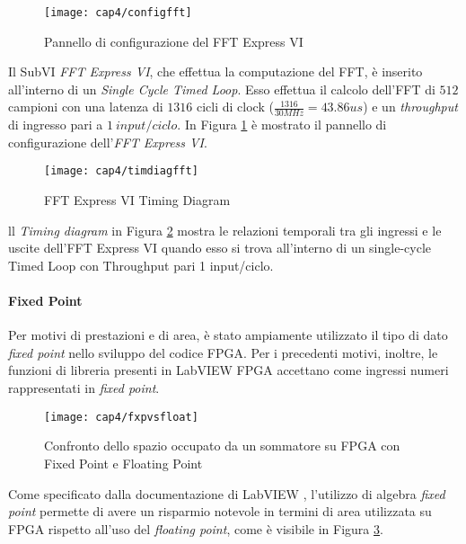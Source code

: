 \begin{figure}  
  \begin{center}
    \texttt{[image: cap4/configfft]}
    \caption{Pannello di configurazione del FFT Express VI}
    \label{configfft}
  \end{center}
\end{figure}

Il SubVI \textit{FFT Express VI}, che effettua la computazione del FFT, è inserito all'interno di un \textit{Single Cycle Timed Loop}. Esso effettua il calcolo dell'FFT di $512$ campioni con una latenza di $1316$ cicli di clock ($\frac{1316}{30MHz}=43.86us$) e un \textit{throughput} di ingresso pari a $1\ input/ciclo$. In Figura \ref{configfft} è mostrato il pannello di configurazione dell'\textit{FFT Express VI}.

\begin{figure}  
  \begin{center}
    \texttt{[image: cap4/timdiagfft]}
    \caption{FFT Express VI Timing Diagram}
    \label{timdiagfft}
  \end{center}
\end{figure}

ll \textit{Timing diagram} in Figura \ref{timdiagfft} mostra le relazioni temporali tra gli ingressi e le uscite dell'FFT Express VI quando esso si trova all'interno di un single-cycle Timed Loop con Throughput pari 1 input/ciclo.

			
\paragraph{Fixed Point}
Per motivi di prestazioni e di area, è stato ampiamente utilizzato il tipo di dato \textit{fixed point} nello sviluppo del codice FPGA. Per i precedenti motivi, inoltre, le funzioni di libreria presenti in LabVIEW FPGA accettano come ingressi numeri rappresentati in \textit{fixed point}.
\begin{figure}  
  \begin{center}
    \texttt{[image: cap4/fxpvsfloat]}
    \caption{Confronto dello spazio occupato da un sommatore su FPGA con Fixed Point e Floating Point}
    \label{fxpvsfloat}
  \end{center}
\end{figure}

Come specificato dalla documentazione di LabVIEW \cite{fxpdoc}, l'utilizzo di algebra \textit{fixed point} permette di avere un risparmio notevole in termini di area utilizzata su FPGA rispetto all'uso del \textit{floating point}, come è visibile in Figura \ref{fxpvsfloat}.

